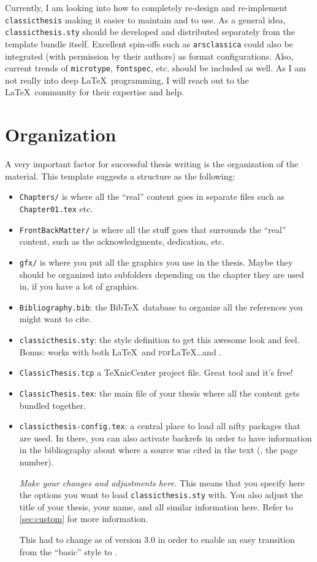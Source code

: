 Currently, I am looking into how to completely re-design and re-implement \texttt{classicthesis} making it easier to maintain and to use. As a general idea, \texttt{classicthesis.sty} should be developed and distributed separately from the template bundle itself. Excellent spin-offs such as \texttt{arsclassica} could also be integrated (with permission by their authors) as format configurations. Also, current trends of \texttt{microtype}, \texttt{fontspec}, etc. should be included as well. As I am not really into deep \LaTeX\ programming, I will reach out to the \LaTeX\ community for their expertise and help.


\section{Organization}
A very important factor for successful thesis writing is the organization of the material. This template suggests a structure as the following:
\begin{itemize}
\item\texttt{Chapters/} is where all the ``real'' content goes in separate files such as \texttt{Chapter01.tex} etc.
\item\texttt{FrontBackMatter/} is where all the stuff goes that surrounds the ``real'' content, such as the acknowledgments, dedication, etc.
\item\texttt{gfx/} is where you put all the graphics you use in the thesis. Maybe they should be organized into subfolders depending on the chapter they are used in, if you have a lot of graphics.
\item\texttt{Bibliography.bib}: the Bib\TeX\ database to organize all the references you might want to cite.
\item\texttt{classicthesis.sty}: the style definition to get this awesome look and feel. Bonus: works with both \LaTeX\ and \textsc{pdf}\LaTeX\dots and \mLyX.
\item\texttt{ClassicThesis.tcp} a \TeX nicCenter project file. Great tool and it's free!
\item\texttt{ClassicThesis.tex}: the main file of your thesis where all the content gets bundled together.
\item\texttt{classicthesis-config.tex}: a central place to load all nifty packages that are used. In there, you can also activate backrefs in order to have information in the bibliography about where a source was cited in the text (\ie, the page number).
    
\emph{Make your changes and adjustments here.} This means that you specify here the options you want to load \texttt{classicthesis.sty} with. You also adjust the title of your thesis, your name, and all similar information here. Refer to \autoref{sec:custom} for more information.

This had to change as of version 3.0 in order to enable an easy transition from the ``basic'' style to \mLyX.
\end{itemize}

